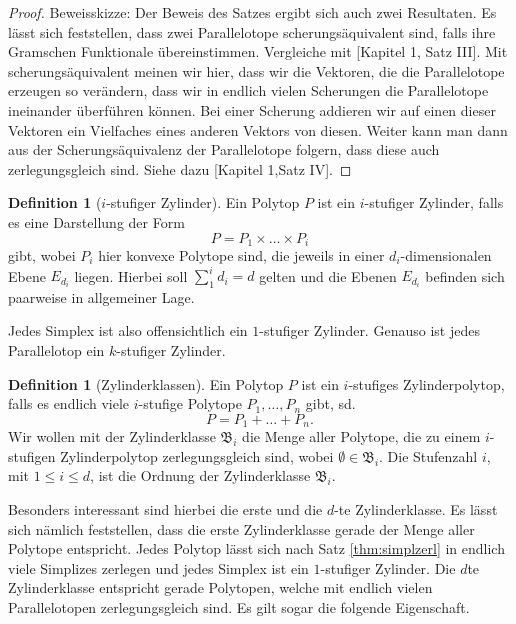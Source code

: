 \documentclass[11pt,titlepage]{article}
\theoremstyle{definition}
\newtheorem{definition}[theorem]{Definition}
\theoremstyle{remark}
\begin{document}
	\begin{proof}
		Beweisskizze: Der Beweis des Satzes ergibt sich auch zwei 
		Resultaten. Es lässt sich feststellen, dass zwei Parallelotope 
		scherungsäquivalent sind, falls ihre Gramschen Funktionale übereinstimmen. 
		Vergleiche mit \cite{Hadwiger}[Kapitel 1, Satz III].
		Mit scherungsäquivalent meinen wir hier, dass wir die 
		Vektoren, die die Parallelotope erzeugen so verändern, dass wir 
		in endlich vielen Scherungen die Parallelotope ineinander 
		überführen können. Bei einer Scherung addieren wir auf einen 
		dieser Vektoren ein Vielfaches eines anderen Vektors von diesen.
		Weiter kann man dann aus der Scherungsäquivalenz der Parallelotope folgern, 
		dass diese auch zerlegungsgleich sind. Siehe dazu 
		\cite{Hadwiger}[Kapitel 1,Satz IV].
	\end{proof}
	
	\begin{definition}[$i$-stufiger Zylinder]
		Ein Polytop $P$ ist ein $i$-stufiger Zylinder, falls es eine Darstellung 
		der Form
		\[P=P_1 \times\ldots\times P_i\]
		gibt, wobei $P_i$ hier konvexe Polytope sind, die jeweils in einer $d_i$-dimensionalen Ebene $E_{d_i}$ liegen. Hierbei soll $\sum_1^i d_i =d$
		gelten und die Ebenen $E_{d_i}$ befinden sich paarweise in allgemeiner Lage.
	\end{definition}
	
	Jedes Simplex ist also offensichtlich ein $1$-stufiger Zylinder. Genauso 
	ist jedes Parallelotop ein $k$-stufiger Zylinder. 
	
	\begin{definition}[Zylinderklassen]
		Ein Polytop $P$ ist ein $i$-stufiges Zylinderpolytop, falls 
		es endlich viele $i$-stufige Polytope $P_1,\ldots,P_n$ gibt, sd.
		\[P=P_1+\ldots+P_n.\]
		Wir wollen mit der Zylinderklasse $\mathfrak{B}_i$ die Menge aller 
		Polytope, die zu einem $i$-stufigen Zylinderpolytop zerlegungsgleich 
		sind, wobei $\emptyset\in\mathfrak{B}_i$. Die Stufenzahl $i$, 
		mit $1\leq i\leq  d$, ist die Ordnung der Zylinderklasse $\mathfrak{B}_i$.
	\end{definition}
	
	Besonders interessant sind hierbei die erste und die $d$-te Zylinderklasse. 
	Es lässt sich nämlich feststellen, dass die erste Zylinderklasse gerade 
	der Menge aller Polytope entspricht. Jedes Polytop lässt sich nach Satz  
	\ref{thm:simplzerl} in endlich viele Simplizes zerlegen und jedes Simplex ist ein $1$-stufiger Zylinder. 
	Die $d$te Zylinderklasse entspricht gerade Polytopen, welche mit endlich vielen 
	Parallelotopen zerlegungsgleich sind. Es gilt sogar die folgende Eigenschaft.
	
\end{document}
